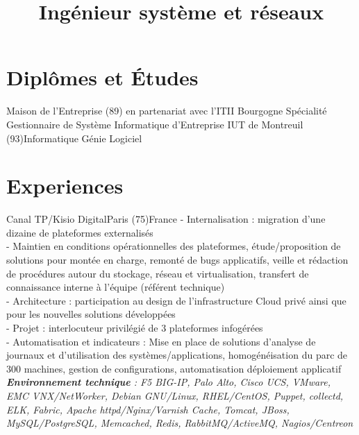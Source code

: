 \documentclass[10pt,a4paper]{moderncv}
\title{Ingénieur système et réseaux}
\begin{document}
\maketitle

\section{Diplômes et Études}
{Maison de l'Entreprise (89) en partenariat avec l'ITII Bourgogne}{}{}
{Spécialité Gestionnaire de Système Informatique d'Entreprise}
{IUT de Montreuil (93)}{}{}{Informatique Génie Logiciel}


\section{Experiences}
{Canal TP/Kisio Digital}{Paris (75)}{France}
{
- Internalisation : migration d'une dizaine de plateformes externalisés\\
- Maintien en conditions opérationnelles des plateformes, étude/proposition de solutions pour montée en charge, remonté de bugs applicatifs, veille et rédaction de procédures autour du stockage, réseau et virtualisation, transfert de connaissance interne à l'équipe (référent technique)\\
- Architecture : participation au design de l'infrastructure Cloud privé ainsi que pour les nouvelles solutions développées\\
- Projet : interlocuteur privilégié de 3 plateformes infogérées\\
- Automatisation et indicateurs : Mise en place de solutions d'analyse de journaux et d'utilisation des systèmes/applications, homogénéisation du parc de 300 machines, gestion de configurations, automatisation déploiement applicatif\\
\textit{\textbf{Environnement technique} : F5 BIG-IP, Palo Alto, Cisco UCS, VMware, EMC VNX/NetWorker, Debian GNU/Linux, RHEL/CentOS, Puppet, collectd, ELK, Fabric, Apache httpd/Nginx/Varnish Cache, Tomcat, JBoss, MySQL/PostgreSQL, Memcached, Redis, RabbitMQ/ActiveMQ, Nagios/Centreon}
\newline{}
}
\end{document}
